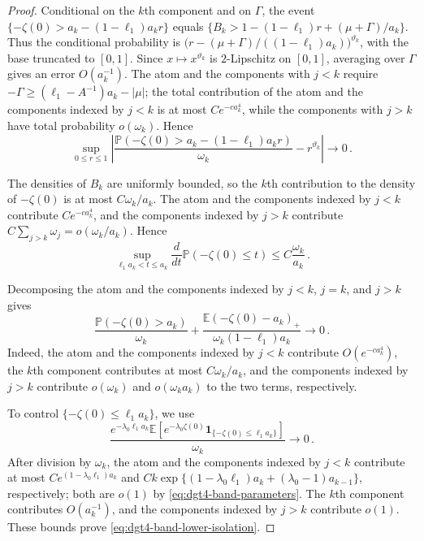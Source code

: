 \documentclass[11pt]{amsart}
\theoremstyle{plain}
\theoremstyle{definition}
\newcommand{\E}{\mathbb{E}}
\renewcommand{\P}{\mathbb{P}}
\newcommand{\one}{\mathbf{1}}
\begin{document}
\begin{proof}
	Conditional on the $k$th component and on $\Gamma$, the event
	$\{-\zeta(0)>a_k-(1-\ell_{1})a_kr\}$ equals
	$\{B_k>1-(1-\ell_{1})r+(\mu+\Gamma)/a_k\}$. Thus the conditional probability
	is $\bigl(r-(\mu+\Gamma)/((1-\ell_{1})a_k)\bigr)^{\vartheta_k}$, with the base truncated to $[0,1]$. Since
	$x\mapsto x^{\vartheta_k}$ is
	$2$-Lipschitz on $[0,1]$, averaging over $\Gamma$ gives an error
	$O(a_k^{-1})$. The atom and the components with $j<k$ require
	$-\Gamma\geq(\ell_{1}-A^{-1})a_k-|\mu|$; the total contribution of the atom
	and the components indexed by $j<k$ is at most
	$Ce^{-ca_k^4}$, while the components with $j>k$ have total probability
	$o(\omega_k)$. Hence
	\begin{equation}\label{eq:dgt4-band-profile}
		\sup_{0\leq r\leq1}
		\left|
		\frac{\P(-\zeta(0)>a_k-(1-\ell_{1})a_kr)}{\omega_k}
		-r^{\vartheta_k}
		\right|
		\longrightarrow0\, .
	\end{equation}

	The densities of $B_k$ are uniformly bounded, so the $k$th contribution
	to the density of $-\zeta(0)$ is at most $C\omega_k/a_k$. The atom and
	the components indexed by $j<k$ contribute $Ce^{-ca_k^4}$, and the
	components indexed by $j>k$ contribute
	$C\sum_{j>k}\omega_j=o(\omega_k/a_k)$. Hence
	\begin{equation}\label{eq:dgt4-band-density}
		\sup_{\ell_{1} a_k<t\leq a_k}
		\frac{d}{dt}\P(-\zeta(0)\leq t)
		\leq C\frac{\omega_k}{a_k}\, .
	\end{equation}

	Decomposing the atom and the components indexed by $j<k$, $j=k$, and
	$j>k$ gives
	\begin{equation}\label{eq:dgt4-band-upper-isolation}
		\frac{\P(-\zeta(0)>a_k)}{\omega_k}
		+
		\frac{\E(-\zeta(0)-a_k)_+}
		{\omega_k(1-\ell_{1})a_k}
		\longrightarrow0\, .
	\end{equation}
	Indeed, the atom and the components indexed by $j<k$ contribute
	$O(e^{-ca_k^4})$, the $k$th component contributes at most
	$C\omega_k/a_k$, and the components indexed by $j>k$ contribute
	$o(\omega_k)$ and $o(\omega_ka_k)$ to the two terms, respectively.

	To control $\{-\zeta(0)\leq\ell_{1} a_k\}$, we use
	\begin{equation}\label{eq:dgt4-band-lower-isolation}
		\frac{
		e^{-\lambda_{0}\ell_{1} a_k}
		\E\left[
		e^{-\lambda_{0}\zeta(0)}
		\one_{\{-\zeta(0)\leq\ell_{1} a_k\}}
		\right]
		}{\omega_k}
		\longrightarrow0\, .
	\end{equation}
	After division by $\omega_k$, the atom and the components indexed by $j<k$
	contribute at most
	$Ce^{(1-\lambda_{0}\ell_{1})a_k}$ and
	$Ck\exp\{(1-\lambda_{0}\ell_{1})a_k+(\lambda_{0}-1)a_{k-1}\}$, respectively;
	both are $o(1)$ by \eqref{eq:dgt4-band-parameters}. The $k$th component
	contributes $O(a_k^{-1})$, and the components indexed by $j>k$ contribute
	$o(1)$. These bounds prove
	\eqref{eq:dgt4-band-lower-isolation}.


\end{proof}
\end{document}
